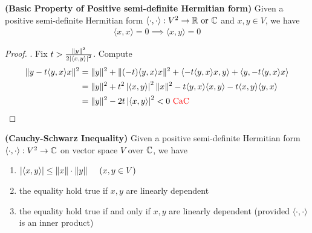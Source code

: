 \documentclass{report}
\begin{document}
\begin{theorem}
\label{BPoP}
\textbf{(Basic Property of Positive semi-definite Hermitian form)} Given a positive semi-definite Hermitian form $\langle \cdot,\cdot\rangle:V^2 \rightarrow \mathbb{R}\text{ or }\mathbb{C} $ and $x,y \in V$, we have 
\begin{align*}
\langle x,x\rangle =0 \implies \langle x,y\rangle =0
\end{align*}
\end{theorem}
\begin{proof}
. Fix $t> \frac{\| y \|^2 }{2\left|\langle x,y\rangle \right|^2}$. Compute 
\begin{align*}
\| y-t\langle y,x\rangle x \|^2 &= \| y \|^2 + \| (-t)\langle y,x\rangle x  \|^2  + \langle -t\langle y,x\rangle x,y \rangle + \langle y,-t\langle y,x\rangle x\rangle \\
&=\| y \|^2 + t^2 \left|\langle x,y\rangle \right|^2 \| x \|^2 -t \langle y,x\rangle \langle x,y\rangle - t \langle x,y\rangle \langle y,x\rangle  \\
&= \| y \|^2- 2t \left|\langle x,y\rangle \right|^2 <0 \text{ \textcolor{red}{CaC} }
\end{align*}
\end{proof}
\begin{theorem}
\label{CSI}
\textbf{(Cauchy-Schwarz Inequality)} Given a positive semi-definite Hermitian form $\langle \cdot,\cdot\rangle :V^2\rightarrow \mathbb{C}$ on vector space $V$ over $\mathbb{C}$, we have 
\begin{enumerate}[label=(\alph*)]
  \item $\left|\langle x,y\rangle\right|\leq  \| x \|\cdot\| y \|\hspace{0.5cm}(x,y \in V)$ 
  \item the equality hold true if $x,y$ are linearly dependent
  \item the equality hold true if and only if $x,y$ are linearly dependent (provided $\langle \cdot,\cdot\rangle $ is an inner product)
\end{enumerate}
\end{theorem}
\end{document}
